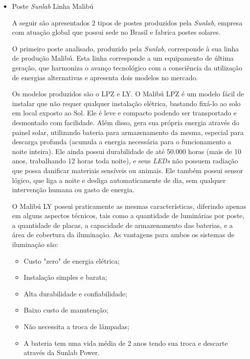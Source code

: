 \begin{itemize}
	 \item Poste \textit{Sunlab} Linha Malibú
	
	A seguir são apresentados 2 tipos de postes produzidos pela \textit{Sunlab}, empresa com atuação global que possui sede no Brasil e fabrica postes solares.
	
	O primeiro poste analisado, produzido pela \textit{Sunlab}, corresponde à sua linha de produção Malibú. Esta linha corresponde a um equipamento de última geração, que harmoniza o avanço tecnológico com a consciência da utilização de energias alternativas e apresenta dois modelos no mercado.

	Os modelos produzidos são o LPZ e  LY. O Malibú LPZ é um modelo fácil de instalar que não requer qualquer instalação elétrica, bastando fixá-lo ao solo em local exposto ao Sol. Ele é leve e compacto podendo ser transportado e desmontado com facilidade. Além disso, gera sua própria energia através do painel solar, utilizando bateria para armazenamento da mesma, especial para descarga profunda (acumula a energia necessária para o funcionamento a noite inteira). Ele ainda possui durabilidade de até 50.000 horas (mais de 10 anos, trabalhando  12 horas toda noite), e seus \textit{LEDs} não possuem radiação que possa danificar materiais sensíveis ou animais.  Ele também possui sensor lógico, que liga a noite e desliga automaticamente de dia, sem qualquer intervenção humana ou gasto de energia.

	O Malibú LY possui praticamente as mesmas características, diferindo apenas em alguns aspectos técnicos, tais como a quantidade  de luminárias por poste, a quantidade de placas, a capacidade de armazenamento das baterias, e a área de cobertura da iluminação. As vantagens para ambos os sistemas de iluminação são: 

	\begin{itemize}
		\item Custo "zero" de energia elétrica;
		\item Instalação simples e barata;
		\item Alta durabilidade e confiabilidade;
		\item Baixo custo de manutenção;
		\item Não necessita a troca de lâmpadas;
		\item A bateria tem uma vida média de 2 anos tendo sua troca e descarte através da Sunlab Power.
	\end{itemize}
	

\end{itemize}
